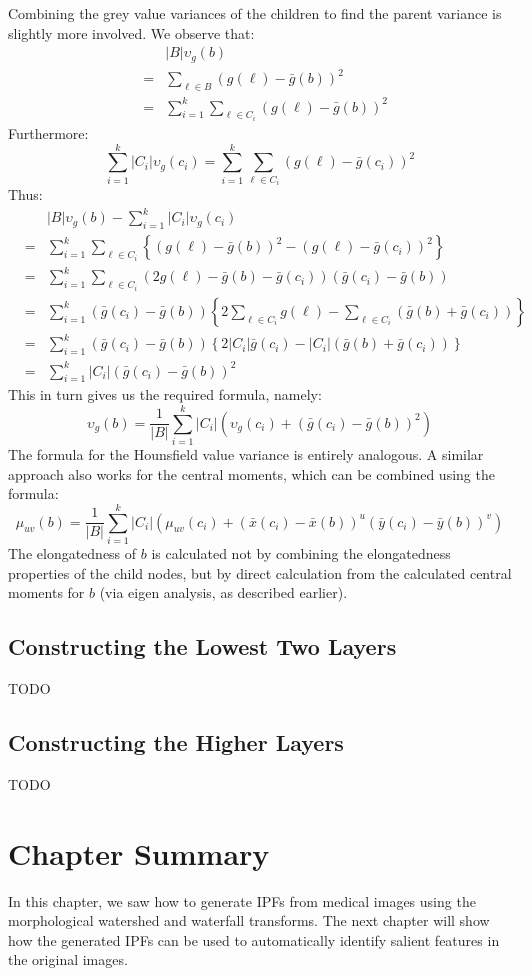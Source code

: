 \noindent Combining the grey value variances of the children to find the parent variance is slightly more involved. We observe that:
%
\begin{eqnarray*}
&   & |B|\upsilon_g(b) \\
& = & \sum_{\ell \in B} (g(\ell) - \bar{g}(b))^2 \\
& = & \sum_{i=1}^k \sum_{\ell \in C_i} (g(\ell) - \bar{g}(b))^2
\end{eqnarray*}
%
\noindent Furthermore:
%
\[
\sum_{i=1}^k |C_i|\upsilon_g(c_i) = \sum_{i=1}^k \sum_{\ell \in C_i} (g(\ell) - \bar{g}(c_i))^2
\]
%
\noindent Thus:
%
\begin{eqnarray*}
&   & |B|\upsilon_g(b) - \sum_{i=1}^k |C_i|\upsilon_g(c_i) \\
%
& = & \sum_{i=1}^k \sum_{\ell \in C_i} \left\{ (g(\ell) - \bar{g}(b))^2 - (g(\ell) - \bar{g}(c_i))^2 \right\} \\
%
& = & \sum_{i=1}^k \sum_{\ell \in C_i} (2g(\ell) - \bar{g}(b) - \bar{g}(c_i))(\bar{g}(c_i) - \bar{g}(b)) \\
%
& = & \sum_{i=1}^k (\bar{g}(c_i) - \bar{g}(b)) \left\{ 2 \sum_{\ell \in C_i} g(\ell) - \sum_{\ell \in C_i} (\bar{g}(b) + \bar{g}(c_i)) \right\} \\
%
& = & \sum_{i=1}^k (\bar{g}(c_i) - \bar{g}(b)) \left\{ 2|C_i|\bar{g}(c_i) - |C_i|(\bar{g}(b) + \bar{g}(c_i)) \right\} \\
%
& = & \sum_{i=1}^k |C_i|(\bar{g}(c_i) - \bar{g}(b))^2
\end{eqnarray*}
%
\noindent This in turn gives us the required formula, namely:
%
\[
\upsilon_g(b) = \frac{1}{|B|} \sum_{i=1}^k |C_i| (\upsilon_g(c_i) + (\bar{g}(c_i) - \bar{g}(b))^2)
\]
%
\noindent The formula for the Hounsfield value variance is entirely analogous. A similar approach also works for the central moments, which can be combined using the formula:
%
\[
\mu_{uv}(b) = \frac{1}{|B|} \sum_{i=1}^k |C_i| (\mu_{uv}(c_i) + (\bar{x}(c_i) - \bar{x}(b))^u (\bar{y}(c_i) - \bar{y}(b))^v)
\]
%
\noindent The elongatedness of $b$ is calculated not by combining the elongatedness properties of the child nodes, but by direct calculation from the calculated central moments for $b$ (via eigen analysis, as described earlier).

\subsection{Constructing the Lowest Two Layers}

TODO

\subsection{Constructing the Higher Layers}

TODO

\section{Chapter Summary}

In this chapter, we saw how to generate IPFs from medical images using the morphological watershed and waterfall transforms. The next chapter will show how the generated IPFs can be used to automatically identify salient features in the original images.
